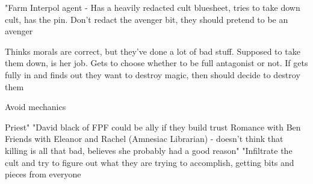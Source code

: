 \documentclass[char]{GL2020}
\begin{document}
\name{\cInterpol{}}







"Farm Interpol agent - Has a heavily redacted cult bluesheet, tries to take down cult, has the pin. Don't redact the avenger bit, they should pretend to be an avenger

Thinks morals are correct, but they've done a lot of bad stuff.  Supposed to take them down, is her job.  Gets to choose whether to be full antagonist or not.  If gets fully in and finds out they want to destroy magic, then should decide to destroy them

Avoid mechanics

Priest"	"David black of FPF could be ally if they build trust
Romance with Ben 
Friends with Eleanor and Rachel (Amnesiac Librarian) - doesn't think that killing is all that bad, believes she probably had a good reason"	"Infiltrate the cult and try to figure out what they are trying to accomplish, getting bits and pieces from everyone
\end{document}
